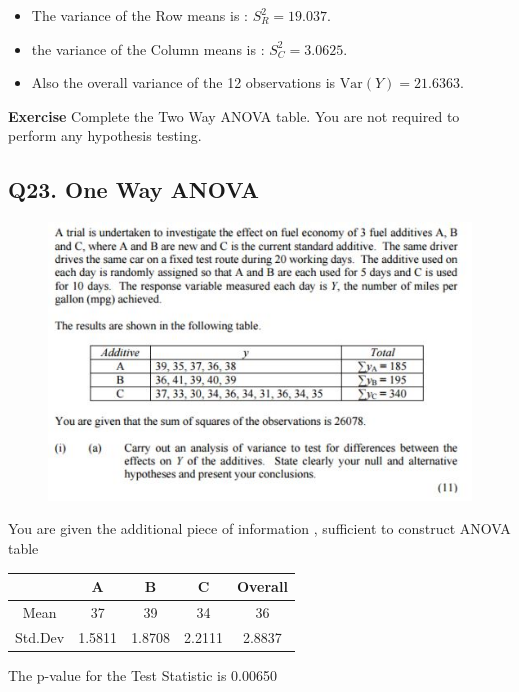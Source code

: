 \documentclass[a4paper,12pt]{article}
\begin{document}
\begin{itemize}
	\item The variance of the Row means is : $S^2_{R} = 19.037$. 
	\item the variance of the Column means is : $S^2_{C} = 3.0625$.	
	\item Also the overall variance of the 12 observations is $\textrm{Var}(Y) = 21.6363 $. 
\end{itemize}

\noindent \textbf{Exercise} Complete the Two Way ANOVA table. You are not required to perform any hypothesis testing.
\newpage
\subsection*{Q23. One Way ANOVA } %


\begin{figure}[h!]
\centering
\includegraphics[width=1.1\linewidth]{images/Q23Review}
\end{figure}
You are given the additional piece of information , sufficient to construct ANOVA table

{
\Large
\begin{center}
\begin{tabular}{|c|c|c|c||c|} 
	\hline  & A & B & C & Overall \\ 
	\hline Mean & 37 & 39& 34 &36 \\ 
	\hline Std.Dev &  1.5811 & 1.8708 & 2.2111 & 2.8837 \\
	
	\hline 
\end{tabular}
\end{center}
}
The p-value for the Test Statistic is 0.00650
\end{document}

